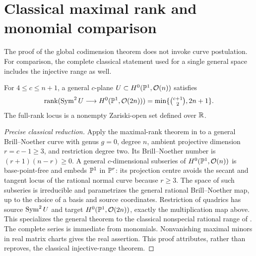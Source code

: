 \section{Classical maximal rank and monomial comparison}\label{app:monomial}
The proof of the global codimension theorem does not invoke curve postulation. For comparison, the complete classical statement used for a single general space includes the injective range as well.
\begin{proposition}\label{prop:classical-maxrank}
For $4\le c\le n+1$, a general $c$-plane $U\subset H^0(\mathbb P^1,\mathcal O(n))$ satisfies
\[
 \operatorname{rank}(\operatorname{Sym}^2U\longrightarrow H^0(\mathbb P^1,\mathcal O(2n)))
    =\min\{\tbinom{c+1}{2},2n+1\}.
\]
The full-rank locus is a nonempty Zariski-open set defined over $\mathbb R$.
\end{proposition}
\begin{proof}[Precise classical reduction]
Apply the maximal-rank theorem in \cite[Theorem 1.2]{Larson} to a general Brill--Noether curve with genus $g=0$, degree $n$, ambient projective dimension $r=c-1\ge3$, and restriction degree two. Its Brill--Noether number is $(r+1)(n-r)\ge0$. A general $c$-dimensional subseries of $H^0(\mathbb P^1,\mathcal O(n))$ is base-point-free and embeds $\mathbb P^1$ in $\mathbb P^r$: its projection centre avoids the secant and tangent locus of the rational normal curve because $r\ge3$. The space of such subseries is irreducible and parametrizes the general rational Brill--Noether map, up to the choice of a basis and source coordinates. Restriction of quadrics has source $\operatorname{Sym}^2U$ and target $H^0(\mathbb P^1,\mathcal O(2n))$, exactly the multiplication map above. This specializes the general theorem to the classical nonspecial rational range of \cite{BE85,BE87}. The complete series is immediate from monomials. Nonvanishing maximal minors in real matrix charts gives the real assertion. This proof attributes, rather than reproves, the classical injective-range theorem.
\end{proof}

